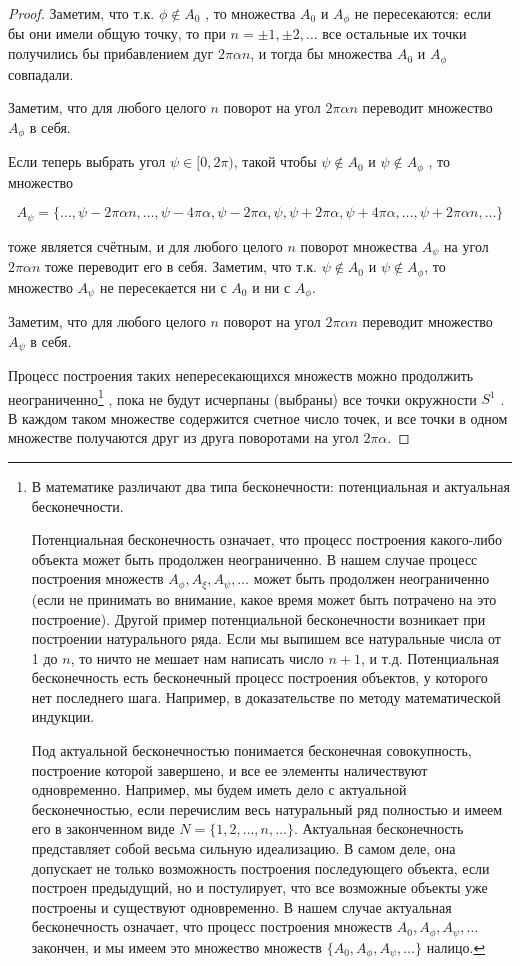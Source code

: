 \begin{proof}
Заметим, что т.к. $\phi \notin A_0$ , то множества $A_0$
и $A_\phi$ не пересекаются: если бы они имели общую точку, то при $n=\pm1, \pm2, \ldots$ все остальные их точки получились бы прибавлением дуг $2\pi\alpha n$, и тогда бы множества $A_0$ и $A_\phi$ совпадали. 

Заметим, что для любого целого $n$ поворот на
угол $2\pi\alpha n$ переводит множество $A_\phi$ в себя.

Если теперь выбрать угол $\psi \in [0, 2\pi)$, такой чтобы $\psi \notin A_0$ и $\psi \notin A_\phi$ , то множество

\begin{equation*}
	A_\psi = \{\ldots , \psi - 2\pi\alpha n, \ldots , \psi - 4\pi\alpha, \psi - 2\pi\alpha, \psi, \psi + 2\pi\alpha, \psi + 4\pi\alpha, \ldots , \psi + 2\pi\alpha n, \ldots \}
\end{equation*}

тоже является счётным, и для любого целого $n$ поворот множества $A_\psi$ на угол $2\pi\alpha n$ тоже переводит его в себя. Заметим, что т.к. $\psi \notin A_0$ и $\psi \notin A_\phi$, то
множество $A_\psi$ не пересекается ни с $A_0$ и ни с $A_\phi$. 

Заметим, что для любого целого $n$ поворот на угол $2\pi\alpha n$ переводит множество $A_\psi$ в себя.

Процесс построения таких непересекающихся множеств можно продолжить неограниченно\footnote{
	В математике различают два типа бесконечности: потенциальная и актуальная бесконечности.

	Потенциальная бесконечность означает, что процесс построения какого-либо объекта может быть продолжен неограниченно. В нашем случае процесс построения множеств $A_\phi , A_\xi , A_\psi , \ldots$ может быть продолжен неограниченно (если не принимать во внимание, какое время может быть потрачено на это построение).
	Другой пример потенциальной бесконечности возникает при построении натурального ряда.
	Если мы выпишем все натуральные числа от 1 до $n$, то ничто не мешает нам написать число $n+1$, и т.д.
	Потенциальная бесконечность есть бесконечный процесс построения объектов, у которого нет последнего шага. Например, в доказательстве по методу математической индукции.

	Под актуальной бесконечностью понимается бесконечная совокупность, построение которой завершено, и все ее элементы наличествуют одновременно. Например, мы будем иметь дело с актуальной бесконечностью, если перечислим весь натуральный ряд полностью и имеем его в законченном виде
	$N = \{1, 2, \ldots , n, \ldots \}$. Актуальная бесконечность представляет собой весьма сильную идеализацию. В
	самом деле, она допускает не только возможность построения последующего объекта, если построен
	предыдущий, но и постулирует, что все возможные объекты уже построены и существуют одновременно.
	В нашем случае актуальная бесконечность означает, что процесс построения множеств $A_0, A_\phi, A_\psi , \ldots$
	закончен, и мы имеем это множество множеств $\{A_0, A_\phi, A_\psi , \ldots\}$ налицо.
}
, пока не будут исчерпаны (выбраны) все точки окружности $S^1$ . В каждом таком множестве содержится счетное число точек, и все
точки в одном множестве получаются друг из друга поворотами на угол $2\pi\alpha$.


\end{proof}
